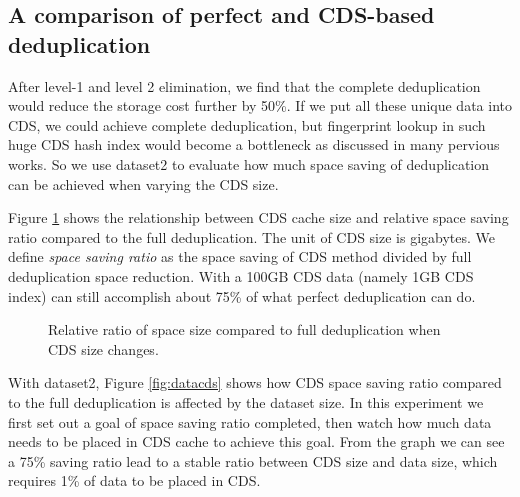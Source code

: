 \subsection{A comparison of perfect and CDS-based deduplication }
After level-1 and level 2 elimination, we find that 
the complete deduplication would reduce the storage cost further by 50\%. 
If we put all these unique data into CDS, 
we could achieve complete deduplication,
but fingerprint lookup in such huge CDS hash index would become a bottleneck as discussed in many pervious works. 
So we use dataset2 to evaluate how much space saving of 
deduplication can be achieved when varying the CDS size.

Figure \ref{fig:datacdssize} shows the relationship between CDS cache size and relative space saving ratio
compared to the full deduplication.  The unit of CDS size is gigabytes.
We define \emph{space saving ratio} as the space saving of CDS method divided by 
full deduplication space reduction. 
With a 100GB CDS data (namely 1GB CDS index) can still  accomplish about 75\% 
of what perfect deduplication can do.

\begin{figure}
  \centering
  \caption{Relative ratio of space size compared to full deduplication when CDS size changes.}
  \label{fig:datacdssize}
\end{figure}

With dataset2, Figure \ref{fig:datacds} shows how CDS space saving ratio
compared to the full deduplication is affected by the dataset size. 
In this experiment we first set out a goal of space saving ratio completed, 
then watch how much data needs to be placed in CDS cache to achieve this goal.
From the graph we can see a 75\% saving ratio lead to a stable ratio between 
CDS size and data size, which requires 1\% of data to be placed in CDS.

